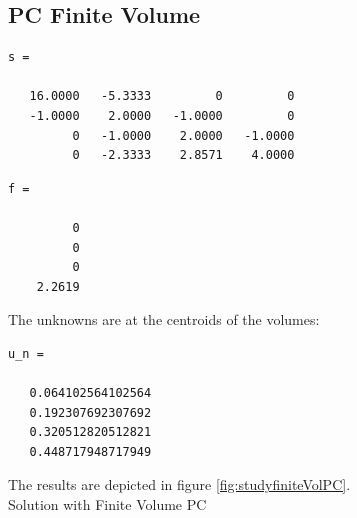 \documentclass[a4paper,12pt]{article}
\makeatletter
\newenvironment{figurehere}
  {\def\@captype{figure}}
  {}
\makeatother
\begin{document}
\subsection{PC Finite Volume}
\begin{verbatim}
s =

   16.0000   -5.3333         0         0
   -1.0000    2.0000   -1.0000         0
         0   -1.0000    2.0000   -1.0000
         0   -2.3333    2.8571    4.0000
\end{verbatim}
\begin{verbatim}
f =

         0
         0
         0
    2.2619
\end{verbatim}
The unknowns are at the centroids of the volumes:
\begin{verbatim}
u_n =

   0.064102564102564
   0.192307692307692
   0.320512820512821
   0.448717948717949
\end{verbatim}
The results are depicted in figure \ref{fig:studyfiniteVolPC}.
\begin{figurehere} 
\centering
{}\\
\caption{Solution with Finite Volume PC}\label{fig:studyfiniteVolPC}
\end{figurehere}
\end{document}
